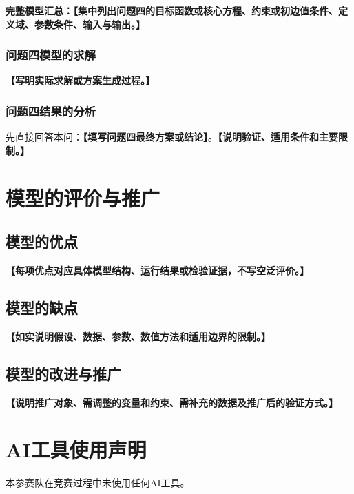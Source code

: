 \documentclass[UTF8,a4paper,12pt,zihao=-4]{ctexart}
\newcommand{\TemplateField}[1]{\textbf{【#1】}}
\newif\ifusedai
\newcommand{\AIUsageSummary}{语言润色、代码调试与排版核验等}
\begin{document}
\noindent\textbf{完整模型汇总：}\TemplateField{集中列出问题四的目标函数或核心方程、约束或初边值条件、定义域、参数条件、输入与输出。}

\subsubsection{问题四模型的求解}
\TemplateField{写明实际求解或方案生成过程。}

\subsubsection{问题四结果的分析}
先直接回答本问：\textbf{【填写问题四最终方案或结论】}。\TemplateField{说明验证、适用条件和主要限制。}

\section{模型的评价与推广}

\subsection{模型的优点}
\TemplateField{每项优点对应具体模型结构、运行结果或检验证据，不写空泛评价。}

\subsection{模型的缺点}
\TemplateField{如实说明假设、数据、参数、数值方法和适用边界的限制。}

\subsection{模型的改进与推广}
\TemplateField{说明推广对象、需调整的变量和约束、需补充的数据及推广后的验证方式。}

\clearpage
\section*{AI工具使用声明}
\ifusedai
本参赛队在竞赛过程中使用了AI工具，主要用于\AIUsageSummary，详细使用情况见支撑材料。
\else
本参赛队在竞赛过程中未使用任何AI工具。
\fi
\end{document}

